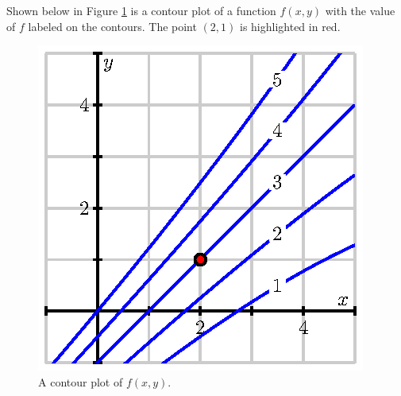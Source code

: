 \begin{activity} \label{A:10.3.8} 
  Shown below in Figure \ref{F:10.3.activity.contour} is a contour
  plot of a function $f(x,y)$ with the value of $f$ labeled on the
  contours.  The point $(2,1)$ is highlighted in red. 

\begin{figure}[ht]
  \begin{center}
    \includegraphics{figures/fig_10_3_activity_contour.eps}
    \caption{A contour plot of $f(x,y)$.}
    \label{F:10.3.activity.contour}
  \end{center}
\end{figure}


\end{activity}
